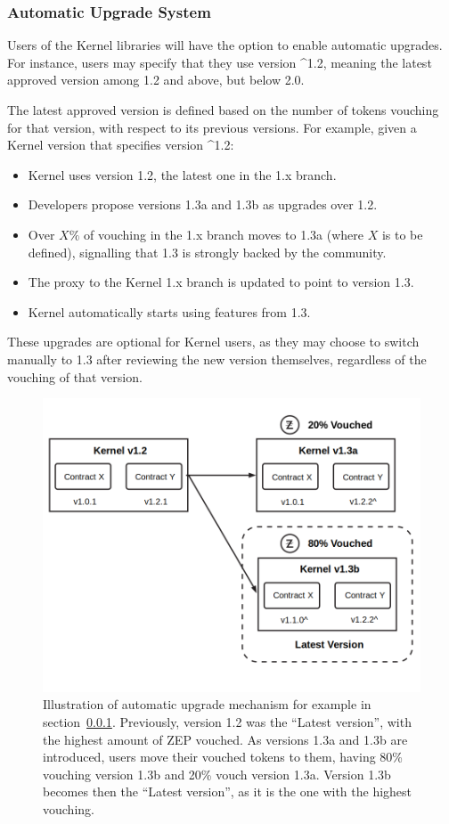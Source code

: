 \documentclass[]{article}
\makeatletter
\DeclareRobustCommand{\_}{%
  \leavevmode\vbox{%
    \hrule\@width.5em
          \@height-.26ex
          \@depth\dimexpr.26ex+.28pt\relax}}
\makeatother
\begin{document}
\subsubsection{Automatic Upgrade System}
\label{autoupgrade}

Users of the Kernel libraries will have the option to enable automatic
upgrades. For instance, users may specify that they use version \^{}1.2,
meaning the latest approved version among 1.2 and above, but below
2.0.

The latest approved version is defined based on the number of
tokens vouching for that version, with respect to its previous versions.
For example, given a Kernel version that specifies version \^{}1.2:

\begin{itemize}
  \item
    Kernel uses version 1.2, the latest one in the 1.x branch.
  \item
    Developers propose versions 1.3a and 1.3b as upgrades over 1.2.
  \item
    Over $X\%$ of vouching in the 1.x branch moves to 1.3a (where $X$ is to
    be defined), signalling that 1.3 is strongly backed by the community.
  \item
    The proxy to the Kernel 1.x branch is updated to point to version 1.3.
  \item
    Kernel automatically starts using features from 1.3.
\end{itemize}

These upgrades are optional for Kernel users, as they may choose to
switch manually to 1.3 after reviewing the new version themselves,
regardless of the vouching of that version.

\pagebreak

\begin{figure}
  \centering
  \includegraphics[width=0.75\linewidth]{images/image1}
  \caption{
Illustration of automatic upgrade mechanism for example in section~\ref{autoupgrade}.
  Previously, version 1.2 was the ``Latest version'', with the highest amount of ZEP
vouched. As versions 1.3a and 1.3b are introduced, users move their vouched tokens
to them, having 80\% vouching version 1.3b and 20\% vouch version 1.3a. Version 1.3b
becomes then the ``Latest version'', as it is the one with the highest vouching.
}
\end{figure}
\end{document}
